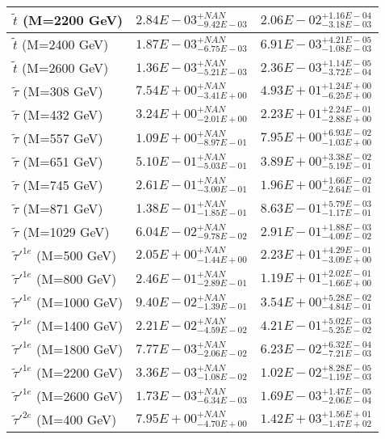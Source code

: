 \documentclass{article}
\begin{document}
\begin{center}
\begin{tabular}{ |l|c|c| }
 \hline
 $\tilde{t}$ (M=2200 GeV) & $2.84E-03^{+NAN}_{-9.42E-03}$ & $2.06E-02^{+1.16E-04}_{-3.18E-03}$ \\
 \hline
 $\tilde{t}$ (M=2400 GeV) & $1.87E-03^{+NAN}_{-6.75E-03}$ & $6.91E-03^{+4.21E-05}_{-1.08E-03}$ \\
 \hline
 $\tilde{t}$ (M=2600 GeV) & $1.36E-03^{+NAN}_{-5.21E-03}$ & $2.36E-03^{+1.14E-05}_{-3.72E-04}$ \\
 \hline
 $\tilde{\tau}$ (M=308 GeV) & $7.54E+00^{+NAN}_{-3.41E+00}$ & $4.93E+01^{+1.24E+00}_{-6.25E+00}$ \\
 \hline
 $\tilde{\tau}$ (M=432 GeV) & $3.24E+00^{+NAN}_{-2.01E+00}$ & $2.23E+01^{+2.24E-01}_{-2.88E+00}$ \\
 \hline
 $\tilde{\tau}$ (M=557 GeV) & $1.09E+00^{+NAN}_{-8.97E-01}$ & $7.95E+00^{+6.93E-02}_{-1.03E+00}$ \\
 \hline
 $\tilde{\tau}$ (M=651 GeV) & $5.10E-01^{+NAN}_{-5.03E-01}$ & $3.89E+00^{+3.38E-02}_{-5.19E-01}$ \\
 \hline
 $\tilde{\tau}$ (M=745 GeV) & $2.61E-01^{+NAN}_{-3.00E-01}$ & $1.96E+00^{+1.66E-02}_{-2.64E-01}$ \\
 \hline
 $\tilde{\tau}$ (M=871 GeV) & $1.38E-01^{+NAN}_{-1.85E-01}$ & $8.63E-01^{+5.79E-03}_{-1.17E-01}$ \\
 \hline
 $\tilde{\tau}$ (M=1029 GeV) & $6.04E-02^{+NAN}_{-9.78E-02}$ & $2.91E-01^{+1.88E-03}_{-4.09E-02}$ \\
 \hline
 $\tilde{\tau}'^{1e}$ (M=500 GeV) & $2.05E+00^{+NAN}_{-1.44E+00}$ & $2.23E+01^{+4.29E-01}_{-3.09E+00}$ \\
 \hline
 $\tilde{\tau}'^{1e}$ (M=800 GeV) & $2.46E-01^{+NAN}_{-2.89E-01}$ & $1.19E+01^{+2.02E-01}_{-1.66E+00}$ \\
 \hline
 $\tilde{\tau}'^{1e}$ (M=1000 GeV) & $9.40E-02^{+NAN}_{-1.39E-01}$ & $3.54E+00^{+5.28E-02}_{-4.84E-01}$ \\
 \hline
 $\tilde{\tau}'^{1e}$ (M=1400 GeV) & $2.21E-02^{+NAN}_{-4.59E-02}$ & $4.21E-01^{+5.02E-03}_{-5.25E-02}$ \\
 \hline
 $\tilde{\tau}'^{1e}$ (M=1800 GeV) & $7.77E-03^{+NAN}_{-2.06E-02}$ & $6.23E-02^{+6.32E-04}_{-7.21E-03}$ \\
 \hline
 $\tilde{\tau}'^{1e}$ (M=2200 GeV) & $3.36E-03^{+NAN}_{-1.08E-02}$ & $1.02E-02^{+8.28E-05}_{-1.19E-03}$ \\
 \hline
 $\tilde{\tau}'^{1e}$ (M=2600 GeV) & $1.73E-03^{+NAN}_{-6.34E-03}$ & $1.69E-03^{+1.47E-05}_{-2.06E-04}$ \\
 \hline
 $\tilde{\tau}'^{2e}$ (M=400 GeV) & $7.95E+00^{+NAN}_{-4.70E+00}$ & $1.42E+03^{+1.56E+01}_{-1.47E+02}$ \\

\end{tabular}
\end{center}
\end{document}
